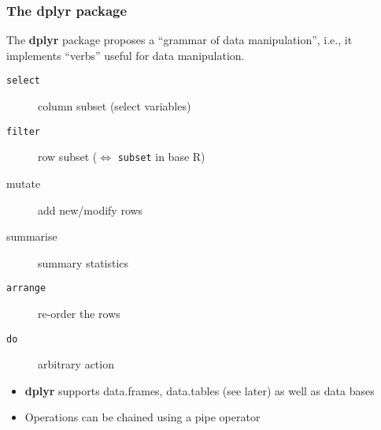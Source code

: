 \documentclass[paper=screen,mathserif]{beamer}\usepackage[]{graphicx}\usepackage[]{color}
\newcommand{\ft}[1]{\frametitle{#1}}
\begin{document}
\begin{frame}
  \ft{The {\bf dplyr} package} 
  
  The {\bf dplyr} package proposes a ``grammar of data manipulation'',
  i.e., it implements ``verbs'' useful for data manipulation.
  
  \begin{description}
  \item[{\tt select}] column subset (select variables)
  \item[{\tt filter}] row subset ($\Leftrightarrow$ {\tt subset} in
    base R)
  \item[mutate] add new/modify rows
  \item[summarise] summary statistics
  \item[{\tt arrange}] re-order the rows
  \item[{\tt do}] arbitrary action
  \end{description}
  
  \begin{itemize}
  \item {\bf dplyr} supports data.frames, data.tables (see later) as
    well as data bases
  \item Operations can be chained using a pipe operator
  \end{itemize}
  
\end{frame}
\end{document}
